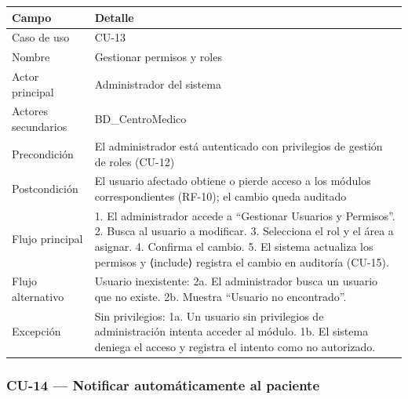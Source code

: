 \documentclass[11pt,a4paper]{article}
\begin{document}
	\begin{longtable}{p{} p{} }
		
		
		\toprule
		\textbf{Campo} &
		\textbf{Detalle}  \\
		\midrule
		\endhead
		
		Caso de uso & CU-13 \\
		Nombre & Gestionar permisos y roles \\
		Actor principal & Administrador del sistema \\
		Actores secundarios & BD\_CentroMedico \\
		Precondición & El administrador está autenticado con privilegios de gestión de roles (CU-12) \\
		Postcondición & El usuario afectado obtiene o pierde acceso a los módulos correspondientes (RF-10); el cambio queda auditado \\
		Flujo principal & 1. El administrador accede a ``Gestionar Usuarios y Permisos''. 2. Busca al usuario a modificar. 3. Selecciona el rol y el área a asignar. 4. Confirma el cambio. 5. El sistema actualiza los permisos y ⟨include⟩ registra el cambio en auditoría (CU-15). \\
		Flujo alternativo & Usuario inexistente: 2a. El administrador busca un usuario que no existe. 2b. Muestra ``Usuario no encontrado''. \\
		Excepción & Sin privilegios: 1a. Un usuario sin privilegios de administración intenta acceder al módulo. 1b. El sistema deniega el acceso y registra el intento como no autorizado. \\
		\bottomrule
	\end{longtable}
	
	\subsubsection{CU-14 --- Notificar automáticamente al paciente}
	
\end{document}
